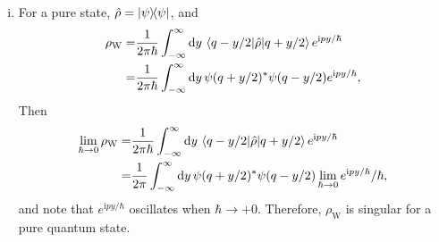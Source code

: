 \documentclass{article}
\newcommand{\iu}{\ensuremath{\mathrm{i}}}
\begin{document}
\begin{enumerate}[1.]
\begin{enumerate}[(i)]
    \item For a pure state, $\hat{\rho} = \op{\psi}$, and
    \begin{align*}
      \rho_\mathrm{W} =& \frac{1}{2\pi\hbar}\int_{-\infty}^{\infty} \dd{y} \mel{q-y/2}{\hat{\rho}}{q + y/2}e^{\iu p y / \hbar} \\
      =&\frac{1}{2\pi\hbar}\int_{-\infty}^{\infty} \dd{y} \psi(q+y/2)^*\psi(q-y/2)e^{\iu p y / \hbar},
    \end{align*}
    Then
    \begin{align*}
      \lim_{\hbar \to 0}\rho_\mathrm{W} =& \frac{1}{2\pi\hbar}\int_{-\infty}^{\infty} \dd{y} \mel{q-y/2}{\hat{\rho}}{q + y/2}e^{\iu p y / \hbar} \\
      =&\frac{1}{2\pi}\int_{-\infty}^{\infty} \dd{y} \psi(q+y/2)^*\psi(q-y/2)\lim_{\hbar \to 0}e^{\iu p y / \hbar}/\hbar,
    \end{align*}
    and note that $e^{\iu p y / \hbar}$ oscillates when $\hbar \to +0$. Therefore, $\rho_\mathrm{W}$ is singular for a pure quantum state.
    

\end{enumerate}
\end{enumerate}
\end{document}

